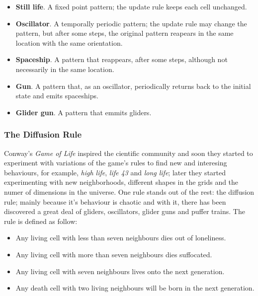 \begin{itemize}
  \item \textbf{Still life}. A fixed point pattern; the update rule keeps each
    cell unchanged.
  \item \textbf{Oscillator}. A temporally periodic pattern; the update rule may
    change the pattern, but after some steps, the original pattern reapears in
    the same location with the same orientation.
  \item \textbf{Spaceship}. A pattern that reappears, after some steps, although
    not necessarily in the same location.
  \item \textbf{Gun}. A pattern that, as an oscillator, periodically returns
    back to the initial state and emits spaceships.
  \item \textbf{Glider gun}. A pattern that emmits gliders.
\end{itemize}

\subsubsection{The Diffusion Rule}
Conway's \textit{Game of Life} inspired the cientific community and soon they
started to experiment with variations of the game's rules to find new and
interesing behaviours, for example, \textit{high life}, \textit{life 43} and
\textit{long life}; later they started experimenting with new neighborhoods,
different shapes in the grids and the numer of dimensions in the universe. One
rule stands out of the rest: the diffusion rule; mainly because it's behaviour
is chaotic and with it, there has been discovered a great deal of gliders,
oscillators, glider guns and puffer trains. The rule is defined as follow:
\begin{itemize}
  \item Any living cell with less than seven neighbours dies out of loneliness.
  \item Any living cell with more than seven neighbours dies suffocated.
  \item Any living cell with seven neighbours lives onto the next generation.
  \item Any death cell with two living neighbours will be born in the next generation.
\end{itemize}

